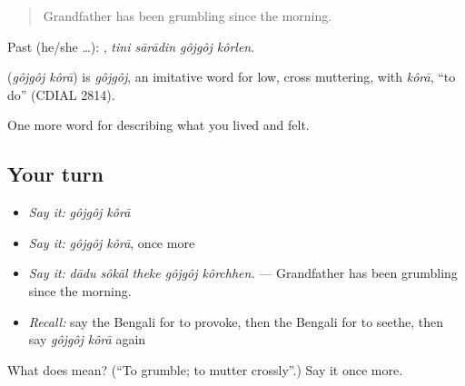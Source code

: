 \begin{quote}
Grandfather has been grumbling since the morning.
\end{quote}

Past (he/she …):    , \emph{tini sārādin gôjgôj kôrlen}.

\begin{cousinweb}
\textbf{ } (\emph{gôjgôj kôrā}) is \emph{gôjgôj}, an imitative word for low, cross muttering, with \emph{kôrā}, \textquotedblleft{}to do\textquotedblright{} (CDIAL 2814).
\end{cousinweb}

\begin{grammarlens}[title={What you've built}]
One more word for describing what you lived and felt.
\end{grammarlens}

\subsection*{Your turn}
\begin{itemize}
\raggedright
  \item \emph{Say it:} \emph{gôjgôj kôrā}
  \item \emph{Say it:} \emph{gôjgôj kôrā}, once more
  \item \emph{Say it:} \emph{dādu sôkāl theke gôjgôj kôrchhen.} — Grandfather has been grumbling since the morning.
  \item \emph{Recall:} say the Bengali for to provoke, then the Bengali for to seethe, then say \emph{gôjgôj kôrā} again
\end{itemize}

\begin{tcolorbox}[breakable,colback=teal!4,colframe=teal!35!black,title={Before you move on}]
What does   mean? (\textquotedblleft{}To grumble; to mutter crossly\textquotedblright{}.) Say it once more.
\end{tcolorbox}
